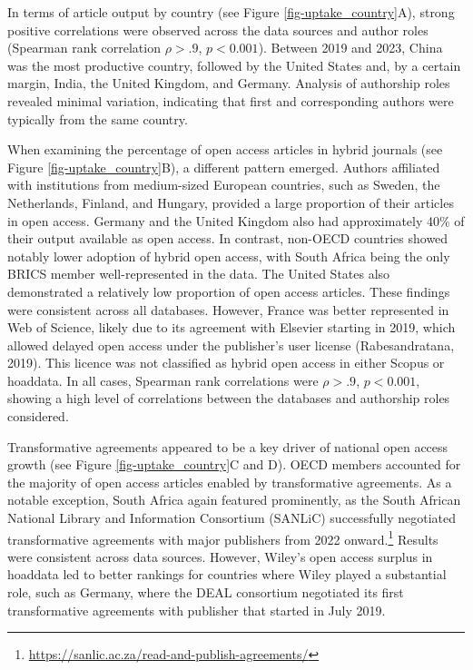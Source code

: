 \documentclass[a4paper,man,floatsintext,longtable,noextraspace,10pt]{apa6}
\begin{document}
In terms of article output by country (see Figure
\ref{fig-uptake_country}A), strong positive correlations were observed
across the data sources and author roles (Spearman rank correlation
\(\rho > .9\), \(p < 0.001\)). Between 2019 and 2023, China was the most
productive country, followed by the United States and, by a certain
margin, India, the United Kingdom, and Germany. Analysis of authorship
roles revealed minimal variation, indicating that first and
corresponding authors were typically from the same country.

When examining the percentage of open access articles in hybrid journals
(see Figure \ref{fig-uptake_country}B), a different pattern emerged.
Authors affiliated with institutions from medium-sized European
countries, such as Sweden, the Netherlands, Finland, and Hungary,
provided a large proportion of their articles in open access. Germany
and the United Kingdom also had approximately 40\% of their output
available as open access. In contrast, non-OECD countries showed notably
lower adoption of hybrid open access, with South Africa being the only
BRICS member well-represented in the data. The United States also
demonstrated a relatively low proportion of open access articles. These
findings were consistent across all databases. However, France was
better represented in Web of Science, likely due to its agreement with
Elsevier starting in 2019, which allowed delayed open access under the
publisher's user license (Rabesandratana, 2019). This licence was not
classified as hybrid open access in either Scopus or hoaddata. In all
cases, Spearman rank correlations were \(\rho > .9\), \(p < 0.001\),
showing a high level of correlations between the databases and
authorship roles considered.

Transformative agreements appeared to be a key driver of national open
access growth (see Figure \ref{fig-uptake_country}C and D). OECD members
accounted for the majority of open access articles enabled by
transformative agreements. As a notable exception, South Africa again
featured prominently, as the South African National Library and
Information Consortium (SANLiC) successfully negotiated transformative
agreements with major publishers from 2022 onward.\footnote{\url{https://sanlic.ac.za/read-and-publish-agreements/}}
Results were consistent across data sources. However, Wiley's open
access surplus in hoaddata led to better rankings for countries where
Wiley played a substantial role, such as Germany, where the DEAL
consortium negotiated its first transformative agreements with publisher
that started in July 2019.
\end{document}
